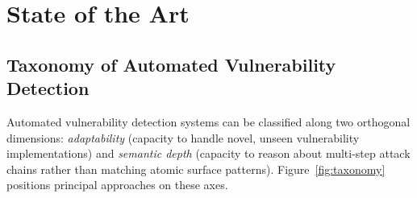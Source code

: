 \documentclass[12pt, a4paper, oneside, openany]{book}
\begin{document}
\chapter{State of the Art}
\label{chap:sota}

\section{Taxonomy of Automated Vulnerability Detection}
\label{sec:taxonomy}

Automated vulnerability detection systems can be classified along two
orthogonal dimensions: \emph{adaptability} (capacity to handle novel,
unseen vulnerability implementations) and \emph{semantic depth}
(capacity to reason about multi-step attack chains rather than
matching atomic surface patterns).  Figure~\ref{fig:taxonomy}
positions principal approaches on these axes.
\end{document}
